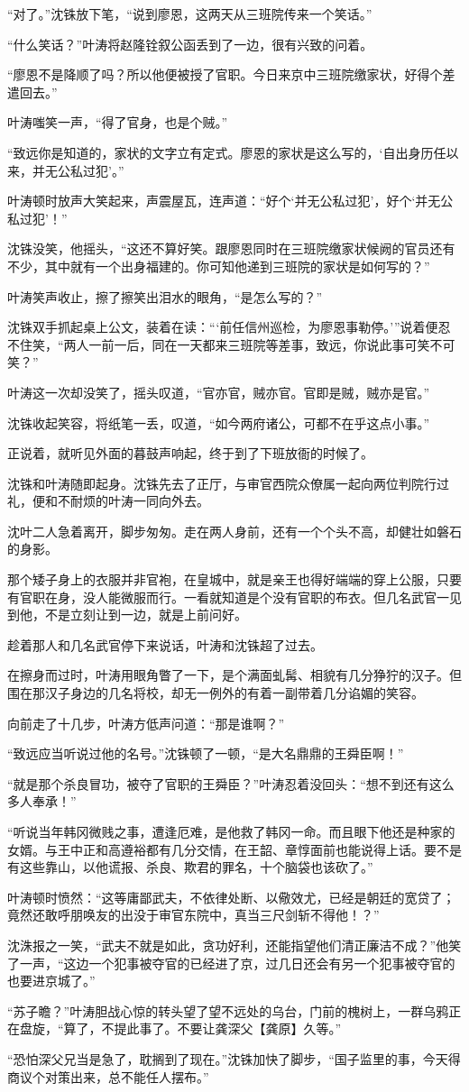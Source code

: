 “对了。”沈铢放下笔，“说到廖恩，这两天从三班院传来一个笑话。”

“什么笑话？”叶涛将赵隆铨叙公函丢到了一边，很有兴致的问着。

“廖恩不是降顺了吗？所以他便被授了官职。今日来京中三班院缴家状，好得个差遣回去。”

叶涛嗤笑一声，“得了官身，也是个贼。”

“致远你是知道的，家状的文字立有定式。廖恩的家状是这么写的，‘自出身历任以来，并无公私过犯’。”

叶涛顿时放声大笑起来，声震屋瓦，连声道：“好个‘并无公私过犯’，好个‘并无公私过犯’！”

沈铢没笑，他摇头，“这还不算好笑。跟廖恩同时在三班院缴家状候阙的官员还有不少，其中就有一个出身福建的。你可知他递到三班院的家状是如何写的？”

叶涛笑声收止，擦了擦笑出泪水的眼角，“是怎么写的？”

沈铢双手抓起桌上公文，装着在读：“‘前任信州巡检，为廖恩事勒停。’”说着便忍不住笑，“两人一前一后，同在一天都来三班院等差事，致远，你说此事可笑不可笑？”

叶涛这一次却没笑了，摇头叹道，“官亦官，贼亦官。官即是贼，贼亦是官。”

沈铢收起笑容，将纸笔一丢，叹道，“如今两府诸公，可都不在乎这点小事。”

正说着，就听见外面的暮鼓声响起，终于到了下班放衙的时候了。

沈铢和叶涛随即起身。沈铢先去了正厅，与审官西院众僚属一起向两位判院行过礼，便和不耐烦的叶涛一同向外去。

沈叶二人急着离开，脚步匆匆。走在两人身前，还有一个个头不高，却健壮如磐石的身影。

那个矮子身上的衣服并非官袍，在皇城中，就是亲王也得好端端的穿上公服，只要有官职在身，没人能微服而行。一看就知道是个没有官职的布衣。但几名武官一见到他，不是立刻让到一边，就是上前问好。

趁着那人和几名武官停下来说话，叶涛和沈铢超了过去。

在擦身而过时，叶涛用眼角瞥了一下，是个满面虬髯、相貌有几分狰狞的汉子。但围在那汉子身边的几名将校，却无一例外的有着一副带着几分谄媚的笑容。

向前走了十几步，叶涛方低声问道：“那是谁啊？”

“致远应当听说过他的名号。”沈铢顿了一顿，“是大名鼎鼎的王舜臣啊！”

“就是那个杀良冒功，被夺了官职的王舜臣？”叶涛忍着没回头：“想不到还有这么多人奉承！”

“听说当年韩冈微贱之事，遭逢厄难，是他救了韩冈一命。而且眼下他还是种家的女婿。与王中正和高遵裕都有几分交情，在王韶、章惇面前也能说得上话。要不是有这些靠山，以他谎报、杀良、欺君的罪名，十个脑袋也该砍了。”

叶涛顿时愤然：“这等庸鄙武夫，不依律处断、以儆效尤，已经是朝廷的宽贷了；竟然还敢呼朋唤友的出没于审官东院中，真当三尺剑斩不得他！？”

沈洙报之一笑，“武夫不就是如此，贪功好利，还能指望他们清正廉洁不成？”他笑了一声，“这边一个犯事被夺官的已经进了京，过几日还会有另一个犯事被夺官的也要进京城了。”

“苏子瞻？”叶涛胆战心惊的转头望了望不远处的乌台，门前的槐树上，一群乌鸦正在盘旋，“算了，不提此事了。不要让龚深父【龚原】久等。”

“恐怕深父兄当是急了，耽搁到了现在。”沈铢加快了脚步，“国子监里的事，今天得商议个对策出来，总不能任人摆布。”


